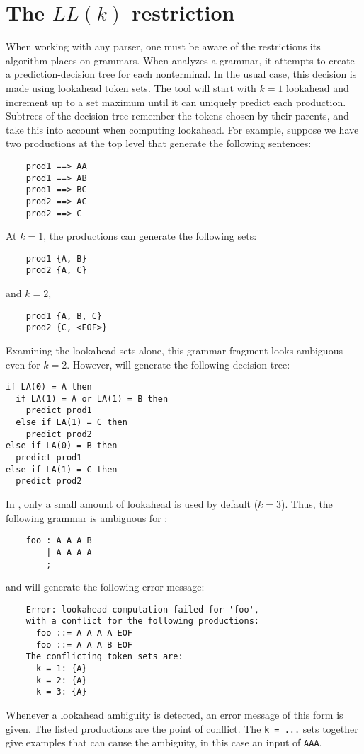 \section{The $LL(k)$ restriction}\label{sec:antlr-llk}

When working with any parser, one must be aware of the restrictions its algorithm places on grammars.
When \antlr{} analyzes a grammar, it attempts to create a prediction-decision
tree for each nonterminal.
In the usual case, this decision is made using lookahead token sets.  The tool will start with $k = 1$
lookahead and increment up to a set maximum until it can
uniquely predict each production.  Subtrees of the decision tree
remember the tokens chosen by their parents, and take this into account
when computing lookahead.  For example, suppose we have two productions
at the top level that generate the following sentences:
\begin{verbatim}
    prod1 ==> AA
    prod1 ==> AB
    prod1 ==> BC
    prod2 ==> AC
    prod2 ==> C
\end{verbatim}
At $k = 1$, the productions can generate the following sets:
\begin{verbatim}
    prod1 {A, B}
    prod2 {A, C}
\end{verbatim}
and $k = 2$,
\begin{verbatim}
    prod1 {A, B, C}
    prod2 {C, <EOF>}
\end{verbatim}
Examining the lookahead sets alone, this grammar fragment looks ambiguous
even for $k = 2$.  However, \antlr{} will generate the following decision
tree:
\begin{lstlisting}
if LA(0) = A then
  if LA(1) = A or LA(1) = B then
    predict prod1
  else if LA(1) = C then
    predict prod2
else if LA(0) = B then
  predict prod1
else if LA(1) = C then
  predict prod2
\end{lstlisting}

In \antlr{}, only a small amount of lookahead is used by default ($k = 3$).  Thus, the following grammar is ambiguous for \antlr{}:
\begin{verbatim}
    foo : A A A B
        | A A A A
        ;
\end{verbatim}
and will generate the following error message:
\begin{verbatim}
    Error: lookahead computation failed for 'foo',
    with a conflict for the following productions:
      foo ::= A A A A EOF
      foo ::= A A A B EOF
    The conflicting token sets are:
      k = 1: {A}
      k = 2: {A}
      k = 3: {A}
\end{verbatim}
Whenever a lookahead ambiguity is detected, an error message of this form is given.  The listed productions are the point of conflict.
The \texttt{k = ...} sets together give examples that can cause the ambiguity, in this case an input of \texttt{AAA}.

